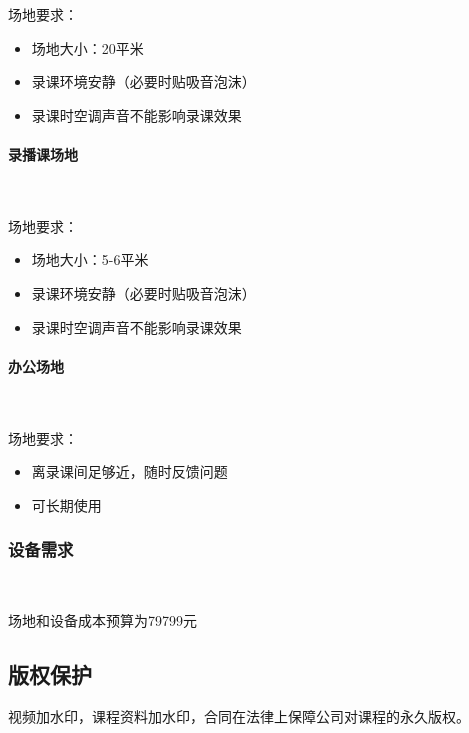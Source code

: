 场地要求：
\begin{itemize}
  \item 场地大小：20平米
  \item 录课环境安静（必要时贴吸音泡沫）
  \item 录课时空调声音不能影响录课效果
\end{itemize}


\paragraph{录播课场地}\

场地要求：
\begin{itemize}
  \item 场地大小：5-6平米
  \item 录课环境安静（必要时贴吸音泡沫）
  \item 录课时空调声音不能影响录课效果
\end{itemize}


\paragraph{办公场地}\

场地要求：
\begin{itemize}
  \item 离录课间足够近，随时反馈问题
  \item 可长期使用
\end{itemize}


\subsubsection{设备需求}\

场地和设备成本预算为79799元


\subsection{版权保护}
视频加水印，课程资料加水印，合同在法律上保障公司对课程的永久版权。












